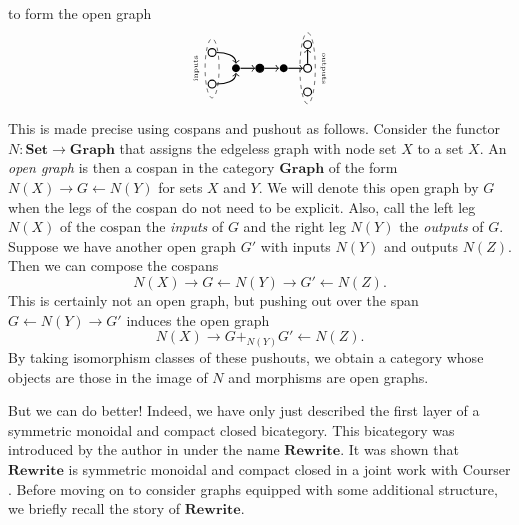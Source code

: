 \documentclass[11pt]{amsart}
\newcommand{\cat}[1]{\mathbf{#1}}
\newcommand{\from}{\colon}
\theoremstyle{remark}
\theoremstyle{definition}
\begin{document}
to form the open graph
\[
\begin{tikzpicture}
	\begin{scope}[shift={(0.2,0)}]
	\node [circle,fill,inner sep=2pt,thick] (1) at (-.2,0) {};
	\node [circle,fill,inner sep=2pt,thick] (2) at (-.8,0) {};
	\node [circle,draw,inner sep=2pt,thick] (3) at (-1.4,0.4) {};
	\node [circle,draw,inner sep=2pt,thick] (4) at (-1.4,-0.4) {};
	\draw [thick,->] (4) edge[out=0,in=-90] (2);
	\draw [thick,->] (3) edge[out=0,in=90] (2);
	\draw [thick,->] (2) edge (1);
	\draw [dashed] (-1.4,0) ellipse (0.5em and 0.75cm);
	\node [rotate=90] at (-1.8,0) {\tiny inputs};
	\end{scope}
	\begin{scope}[shift={(1.4,0)}]
	\node [circle,draw,inner sep=2pt,thick] (1) at (-.2,0.6) {};
	\node [circle,draw,inner sep=2pt,thick] (2) at (-.2,0) {};
	\node [circle,draw,inner sep=2pt,thick] (3) at (-.2,-0.6) {};
	\node [circle,fill,inner sep=2pt,thick] (4) at (-.8,0) {};
	\node [circle,draw,inner sep=2pt,thick] (6) at (-1.4,0) {};
	\draw [thick,->] (6) edge (4);
	\draw [thick,->] (4) edge (2);
	\draw [thick,->] (2) edge (1);
	\draw [dashed] (-0.2,0) ellipse (0.55em and 0.9cm);
	\node [rotate=-90] at (0.2,0) {\tiny outputs};
	\end{scope}
\end{tikzpicture}
\]

This is made precise using cospans and pushout as follows. Consider the functor $N \from \cat{Set} \to \cat{Graph}$ that assigns the edgeless graph with node set $X$ to a set $X$.  An \emph{open graph} is then a cospan in the category $\cat{Graph}$ of the form $N(X) \to G \gets N(Y)$ for sets $X$ and $Y$. We will denote this open graph by $G$ when the legs of the cospan do not need to be explicit.  Also, call the left leg $N(X)$ of the cospan the \emph{inputs} of $G$ and the right leg $N(Y)$ the \emph{outputs} of $G$.  Suppose we have another open graph $G'$ with inputs $N(Y)$ and outputs $N(Z)$.  Then we can compose the cospans 
\[
	N(X) \to G \gets N(Y) \to G' \gets N(Z). 
\] 
This is certainly not an open graph, but pushing out over the span $G \gets N(Y) \to G'$ induces the open graph  
\[
	N(X) \to G +_{N(Y)} G' \gets N(Z).
\] 
By taking isomorphism classes of these pushouts, we obtain a category whose objects are those in the image of $N$ and morphisms are open graphs. 

But we can do better! Indeed, we have only just described the first layer of a symmetric monoidal and compact closed bicategory. This bicategory was introduced by the author in \cite{Cic} under the name $\cat{Rewrite}$. It was shown that $\cat{Rewrite}$ is symmetric monoidal and compact closed in a joint work with Courser . Before moving on to consider graphs equipped with some additional structure, we briefly recall the story of $\cat{Rewrite}$.
\end{document}
